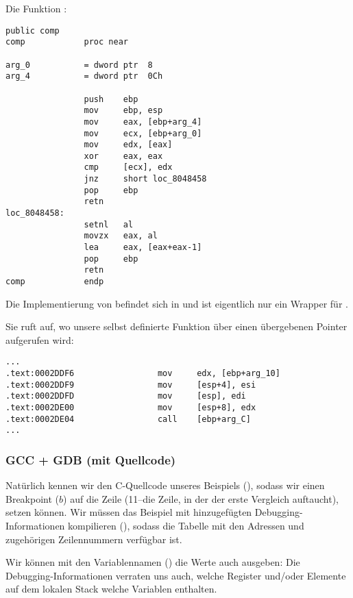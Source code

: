 Die Funktion \comp:

\begin{lstlisting}[style=customasmx86]
                public comp
comp            proc near

arg_0           = dword ptr  8
arg_4           = dword ptr  0Ch

                push    ebp
                mov     ebp, esp
                mov     eax, [ebp+arg_4]
                mov     ecx, [ebp+arg_0]
                mov     edx, [eax]
                xor     eax, eax
                cmp     [ecx], edx
                jnz     short loc_8048458
                pop     ebp
                retn
loc_8048458:
                setnl   al
                movzx   eax, al
                lea     eax, [eax+eax-1]
                pop     ebp
                retn
comp            endp
\end{lstlisting}

Die Implementierung von \qsort befindet sich in  und ist eigentlich nur ein Wrapper für .

Sie ruft  auf, wo unsere selbst definierte Funktion über einen übergebenen Pointer aufgerufen wird:

\begin{lstlisting}[caption=(file libc.so.6{,} glibc version---2.10.1),style=customasmx86]
...
.text:0002DDF6                 mov     edx, [ebp+arg_10]
.text:0002DDF9                 mov     [esp+4], esi
.text:0002DDFD                 mov     [esp], edi
.text:0002DE00                 mov     [esp+8], edx
.text:0002DE04                 call    [ebp+arg_C]
...
\end{lstlisting}

\subsubsection{GCC + GDB (mit Quellcode)}
Natürlich kennen wir den C-Quellcode unseres Beispiels (), sodass wir einen Breakpoint ($b$) auf die
Zeile (11--die Zeile, in der der erste Vergleich auftaucht), setzen können.
Wir müssen das Beispiel mit hinzugefügten Debugging-Informationen kompilieren (), sodass die Tabelle mit den
Adressen und zugehörigen Zeilennummern verfügbar ist.

Wir können mit den Variablennamen () die Werte auch ausgeben:
Die Debugging-Informationen verraten uns auch, welche Register und/oder Elemente auf dem lokalen Stack welche Variablen
enthalten.

